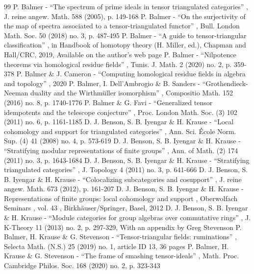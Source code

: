 \documentclass[10pt,a4paper]{article}
\numberwithin{equation}{section}
\theoremstyle{definition}
\begin{document}
\begin{thebibliography}{99}
 P. Balmer - “The spectrum of prime ideals in tensor triangulated categories” , J. reine angew. Math. 588 (2005), p. 149-168
 P. Balmer - “On the surjectivity of the map of spectra associated to a tensor-triangulated functor” , Bull. London Math. Soc. 50 (2018) no. 3, p. 487-495
 P. Balmer - “A guide to tensor-triangular classification” , in Handbook of homotopy theory (H. Miller, ed.), Chapman and Hall/CRC, 2019, Available on the author’s web page
 P. Balmer - “Nilpotence theorems via homological residue fields” , Tunis. J. Math. 2 (2020) no. 2, p. 359-378
 P. Balmer \& J. Cameron - “Computing homological residue fields in algebra and topology” , 2020
 P. Balmer, I. Dell’Ambrogio \& B. Sanders - “Grothendieck-Neeman duality and the Wirthmüller isomorphism” , Compositio Math. 152 (2016) no. 8, p. 1740-1776
 P. Balmer \& G. Favi - “Generalized tensor idempotents and the telescope conjecture” , Proc. London Math. Soc. (3) 102 (2011) no. 6, p. 1161-1185
 D. J. Benson, S. B. Iyengar \& H. Krause - “Local cohomology and support for triangulated categories” , Ann. Sci. École Norm. Sup. (4) 41 (2008) no. 4, p. 573-619
 D. J. Benson, S. B. Iyengar \& H. Krause - “Stratifying modular representations of finite groups” , Ann. of Math. (2) 174 (2011) no. 3, p. 1643-1684
 D. J. Benson, S. B. Iyengar \& H. Krause - “Stratifying triangulated categories” , J. Topology 4 (2011) no. 3, p. 641-666
 D. J. Benson, S. B. Iyengar \& H. Krause - “Colocalizing subcategories and cosupport” , J. reine angew. Math. 673 (2012), p. 161-207
 D. J. Benson, S. B. Iyengar \& H. Krause - Representations of finite groups: local cohomology and support , Oberwolfach Seminars , vol. 43 , Birkhäuser/Springer, Basel, 2012
 D. J. Benson, S. B. Iyengar \& H. Krause - “Module categories for group algebras over commutative rings” , J. K-Theory 11 (2013) no. 2, p. 297-329, With an appendix by Greg Stevenson
 P. Balmer, H. Krause \& G. Stevenson - “Tensor-triangular fields: ruminations” , Selecta Math. (N.S.) 25 (2019) no. 1, article ID 13, 36 pages
 P. Balmer, H. Krause \& G. Stevenson - “The frame of smashing tensor-ideals” , Math. Proc. Cambridge Philos. Soc. 168 (2020) no. 2, p. 323-343

\end{thebibliography}
\end{document}
